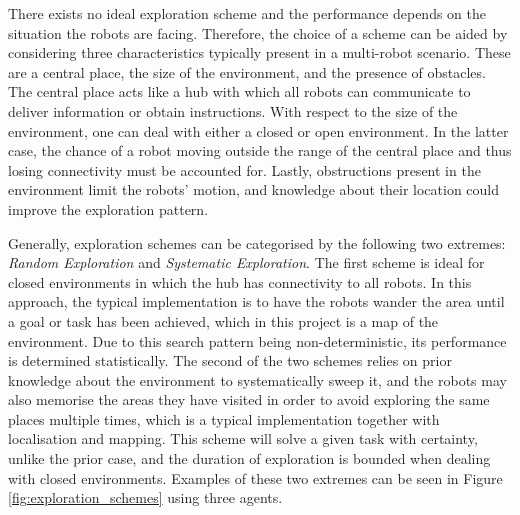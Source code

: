 There exists no ideal exploration scheme and the performance depends on the situation the robots are facing. Therefore, the choice of a scheme can be aided by considering three characteristics typically present in a multi-robot scenario. These are a central place, the size of the environment, and the presence of obstacles. The central place acts like a hub with which all robots can communicate to deliver information or obtain instructions. With respect to the size of the environment, one can deal with either a closed or open environment. In the latter case, the chance of a robot moving outside the range of the central place and thus losing connectivity must be accounted for. Lastly, obstructions present in the environment limit the robots' motion, and knowledge about their location could improve the exploration pattern. 

Generally, exploration schemes can be categorised by the following two extremes: \textit{Random Exploration} and \textit{Systematic Exploration}. The first scheme is ideal for closed environments in which the hub has connectivity to all robots. In this approach, the typical implementation is to have the robots wander the area until a goal or task has been achieved, which in this project is a map of the environment. Due to this search pattern being non-deterministic, its performance is determined statistically. The second of the two schemes relies on prior knowledge about the environment to systematically sweep it, and the robots may also memorise the areas they have visited in order to avoid exploring the same places multiple times, which is a typical implementation together with localisation and mapping. This scheme will solve a given task with certainty, unlike the prior case, and the duration of exploration is bounded when dealing with closed environments. Examples of these two extremes can be seen in Figure \ref{fig:exploration_schemes} using three agents.        

